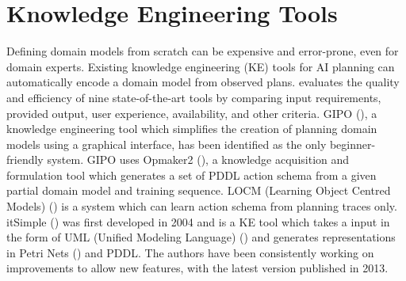 \section{Knowledge Engineering Tools}\label{subsec:Knowledge Engineering}
Defining domain models from scratch can be expensive and error-prone, even for domain experts.
Existing knowledge engineering (KE) tools for AI planning can automatically encode a domain model from observed plans.
\cite{jilani2014automated} evaluates the quality and efficiency of nine state-of-the-art tools by comparing input requirements, provided output, user experience, availability, and other criteria.
GIPO (\cite{simpson2007planning}), a knowledge engineering tool which simplifies the creation of planning domain models using a graphical interface, has been identified as the only beginner-friendly system.
GIPO uses Opmaker2 (\cite{mccluskey2009automated}), a knowledge acquisition and formulation tool which generates a set of PDDL action schema from a given partial domain model and training sequence.
LOCM (Learning Object Centred Models) (\cite{cresswell2013acquiring}) is a system which can learn action schema from planning traces only.
itSimple (\cite{vaquero2013itsimple}) was first developed in 2004 and is a KE tool which takes a input in the form of UML (Unified Modeling Language) (\cite{omg2005unified}) and generates representations in Petri Nets (\cite{murata1989petri}) and PDDL. The authors have been consistently working on improvements to allow new features, with the latest version published in 2013.